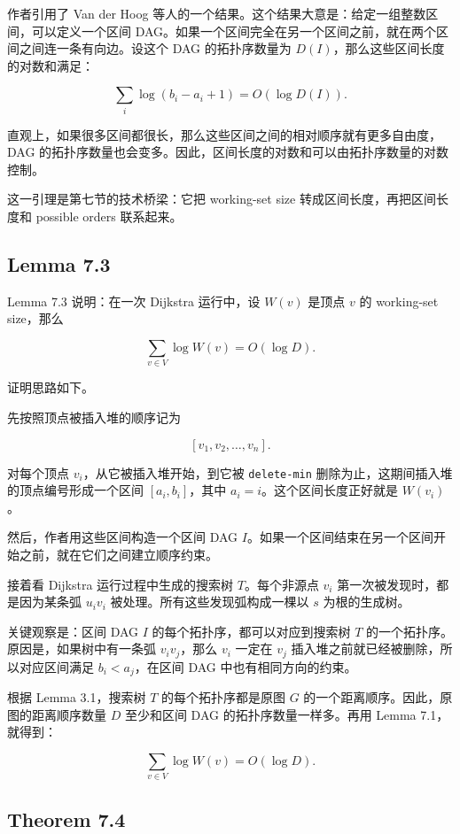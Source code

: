 \documentclass[UTF8]{ctexart}
\begin{document}
作者引用了 Van der Hoog 等人的一个结果。这个结果大意是：给定一组整数区间，可以定义一个区间 DAG。如果一个区间完全在另一个区间之前，就在两个区间之间连一条有向边。设这个 DAG 的拓扑序数量为 \(D(I)\)，那么这些区间长度的对数和满足：

\[
\sum_i \log(b_i-a_i+1)=O(\log D(I)).
\]

直观上，如果很多区间都很长，那么这些区间之间的相对顺序就有更多自由度，DAG 的拓扑序数量也会变多。因此，区间长度的对数和可以由拓扑序数量的对数控制。

这一引理是第七节的技术桥梁：它把 working-set size 转成区间长度，再把区间长度和 possible orders 联系起来。

\subsection*{Lemma 7.3}

Lemma 7.3 说明：在一次 Dijkstra 运行中，设 \(W(v)\) 是顶点 \(v\) 的 working-set size，那么

\[
\sum_{v\in V}\log W(v)=O(\log D).
\]

证明思路如下。

先按照顶点被插入堆的顺序记为

\[
[v_1,v_2,\ldots,v_n].
\]

对每个顶点 \(v_i\)，从它被插入堆开始，到它被 \texttt{delete-min} 删除为止，这期间插入堆的顶点编号形成一个区间 \([a_i,b_i]\)，其中 \(a_i=i\)。这个区间长度正好就是 \(W(v_i)\)。

然后，作者用这些区间构造一个区间 DAG \(I\)。如果一个区间结束在另一个区间开始之前，就在它们之间建立顺序约束。

接着看 Dijkstra 运行过程中生成的搜索树 \(T\)。每个非源点 \(v_i\) 第一次被发现时，都是因为某条弧 \(u_i v_i\) 被处理。所有这些发现弧构成一棵以 \(s\) 为根的生成树。

关键观察是：区间 DAG \(I\) 的每个拓扑序，都可以对应到搜索树 \(T\) 的一个拓扑序。原因是，如果树中有一条弧 \(v_i v_j\)，那么 \(v_i\) 一定在 \(v_j\) 插入堆之前就已经被删除，所以对应区间满足 \(b_i<a_j\)，在区间 DAG 中也有相同方向的约束。

根据 Lemma 3.1，搜索树 \(T\) 的每个拓扑序都是原图 \(G\) 的一个距离顺序。因此，原图的距离顺序数量 \(D\) 至少和区间 DAG 的拓扑序数量一样多。再用 Lemma 7.1，就得到：

\[
\sum_{v\in V}\log W(v)=O(\log D).
\]

\subsection*{Theorem 7.4}
\end{document}

